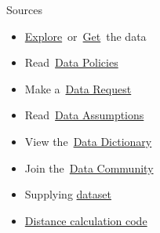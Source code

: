 \documentclass[
  ignorenonframetext,
]{beamer}
\providecommand{\tightlist}{%
  \setlength{\itemsep}{0pt}\setlength{\parskip}{0pt}}\usepackage{longtable,booktabs,array}
\begin{document}
\begin{frame}{Sources}
\protect\hypertarget{sources}{}
\begin{itemize}
\tightlist
\item
  \href{http://insideairbnb.com/explore}{Explore}~or~\href{http://insideairbnb.com/get-the-data}{Get}~the
  data
\item
  Read~\href{http://insideairbnb.com/data-policies}{Data Policies}
\item
  Make a~\href{http://insideairbnb.com/data-requests}{Data Request}
\item
  Read~\href{http://insideairbnb.com/data-assumptions}{Data Assumptions}
\item
  View
  the~\href{https://docs.google.com/spreadsheets/d/1iWCNJcSutYqpULSQHlNyGInUvHg2BoUGoNRIGa6Szc4/edit?usp=sharing}{Data
  Dictionary}
\item
  Join the~\href{http://insideairbnb.com/data-community}{Data Community}
\item
  Supplying
  \href{https://open.canada.ca/data/en/dataset/763fe3b8-cdc3-4b8a-bbbd-a0a9bc587c56}{dataset}
\item
  \href{https://www.geeksforgeeks.org/program-distance-two-points-earth/}{Distance
  calculation code}
\end{itemize}
\end{frame}
\end{document}
